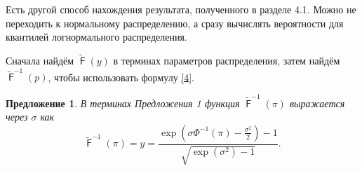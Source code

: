 \documentclass[12pt]{article}
\newtheorem{proposition}[theorem]{Предложение}
\DeclareMathOperator{\F}{\mathsf{F}}
\begin{document}
	Есть другой способ нахождения результата, полученного в разделе 4.1. Можно не переходить к нормальному распределению, а сразу вычислять вероятности для квантилей логнормального распределения.
	
	Сначала найдём $\tilde{\F}(y)$ в терминах параметров распределения, затем найдём $\tilde{\F}^{-1}(p)$, чтобы использовать формулу \eqref{4}.
	
	\begin{proposition}\label{pr2}
		В терминах Предложения 1 функция $\tilde{\F}^{-1}(\pi)$ выражается через $\sigma$ как
		\begin{equation}
			\displaystyle{\tilde{\F}^{-1}(\pi) = y = \frac{\exp(\sigma\Phi^{-1}(\pi) - \frac{\sigma^{2} }{2})-1}{\sqrt{\exp(\sigma ^{2})-1}}}.
		\end{equation}\label{12}
	\end{proposition}
\end{document}
